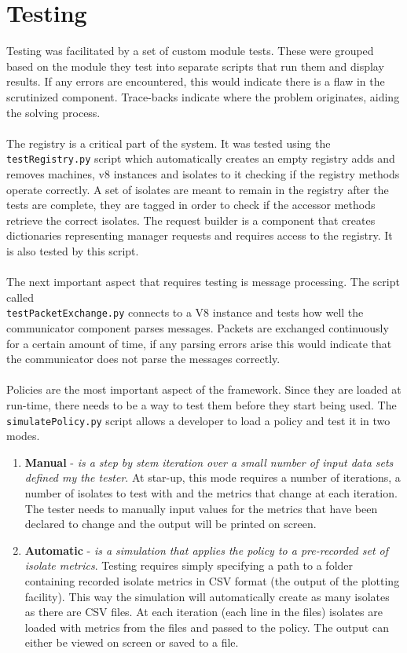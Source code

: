 \documentclass{l4proj}
\begin{document}
\section{Testing}
\hspace*{1em} Testing was facilitated by a set of custom module tests. These were grouped based on the module they test into separate scripts that run them and display results. If any errors are encountered, this would indicate there is a flaw in the scrutinized component. Trace-backs indicate where the problem originates, aiding the solving process. 
\\\\
\hspace*{1em} The registry is a critical part of the system. It was tested using the \texttt{testRegistry.py} script which automatically creates an empty registry adds and removes machines, v8 instances and isolates to it checking if the registry methods operate correctly. A set of isolates are meant to remain in the registry after the tests are complete, they are tagged in order to check if the accessor methods retrieve the correct isolates. The request builder is a component that creates dictionaries representing manager requests and requires access to the registry. It is also tested by this script. 
\\\\
\hspace*{1em} The next important aspect that requires testing is message processing. The script called \\ \texttt{testPacketExchange.py} connects to a V8 instance and tests how well the communicator component parses messages. Packets are exchanged continuously for a certain amount of time, if any parsing errors arise this would indicate that the communicator does not parse the messages correctly.
\\\\
\hspace*{1em} Policies are the most important aspect of the framework. Since they are loaded at run-time, there needs to be a way to test them before they start being used. The \texttt{simulatePolicy.py} script allows a developer to load a policy and test it in two modes.
\begin{enumerate}
\item \textbf{Manual} - \textit{is a step by stem iteration over a small number of input data sets defined my the tester}. At star-up, this mode requires a number of iterations, a number of isolates to test with and the metrics that change at each iteration. The tester needs to manually input values for the metrics that have been declared to change and the output will be printed on screen.
\item \textbf{Automatic} - \textit{is a simulation that applies the policy to a pre-recorded set of isolate metrics}. Testing requires simply specifying a path to a folder containing recorded isolate metrics in CSV format (the output of the plotting facility). This way the simulation will automatically create as many isolates as there are CSV files. At each iteration (each line in the files) isolates are loaded with metrics from the files and passed to the policy. The output can either be viewed on screen or saved to a file. 
\end{enumerate} 
\end{document}
